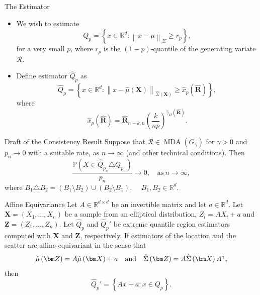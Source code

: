 \documentclass[11pt, aspectratio=169]{beamer}
\DeclareMathOperator{\mda}{MDA}
\begin{document}
\begin{frame}{The Estimator}
  \begin{itemize}
    \item We wish to estimate
    \begin{equation*}
      Q_{p} = \left\{x \in \mathbb{R}^d : \left\|x - \mu\right\|_\Sigma
      \geq r_{p}\right\},
    \end{equation*}
    for a very small $p$, where $r_{p}$ is the $(1-p)$-quantile of the
    generating variate $\mathcal{R}$. \pause
    \item Define estimator $\hat Q_{p}$ as
    \begin{equation*}
      \hat Q_{p} = \left\{x \in \mathbb{R}^d :
      \left\|x - \hat\mu\left(\bm X\right)\right\|
      _{\hat\Sigma\left(\bm X\right)}
      \geq \hat x_{p}(\hat{\bm R})\right\},
    \end{equation*}
    where
    \begin{equation*}
      \hat x_{p}(\hat{\bm R}) = \hat{\bm R}_{n-k, n}
      \left(\frac{k}{np}\right)^{\hat\gamma_H(\hat{\bm R})}.
    \end{equation*}
  \end{itemize}
\end{frame}


\begin{frame}{Draft of the Consistency Result}
  Suppose that $\mathcal{R}\in\mda\left(G_\gamma\right)$ for $\gamma > 0$ and
  $p_n\to 0$ with a suitable rate, as $n\to\infty$ (and other technical
  conditions). Then
  \begin{equation*}
    \frac{\mathbb{P}\left(X\in\hat Q_{p_n}\triangle Q_{p_n}\right)}{p_n}
    \to 0, \quad \text{as}\ n\to\infty,
  \end{equation*}
  where $B_1\triangle B_2 = (B_1\setminus B_2) \cup (B_2\setminus B_1)$, $\quad
  B_1,B_2\in\mathbb{R}^d$. 
\end{frame}


\begin{frame}{Affine Equivariance}
  Let $A\in\mathbb{R}^{d\times d}$ be an invertible matrix and let
  $a\in\mathbb{R}^d$. Let $\bm X = \left(X_1, \ldots, X_n\right)$ be a sample
  from an elliptical distribution, $Z_i = AX_i + a$ and $\bm Z = \left(Z_1,
  \ldots, Z_n\right)$. Let $\hat Q_p$ and $\hat Q_p'$ be extreme quantile region
  estimators computed with $\bm X$ and $\bm Z$, respectively. If estimators of
  the location and the scatter are affine equivariant in the sense that
  \begin{equation*}
    \hat\mu\left(\bm Z\right) = A\hat\mu\left(\bm X\right) + a
    \quad\textnormal{and}\quad
    \hat\Sigma\left(\bm Z\right) = A\hat\Sigma\left(\bm X\right) A^\intercal,
  \end{equation*}
  then
  \begin{equation*}
    \hat Q_p' = \left\{Ax + a: x\in Q_p\right\}.
  \end{equation*}
\end{frame}
\end{document}
